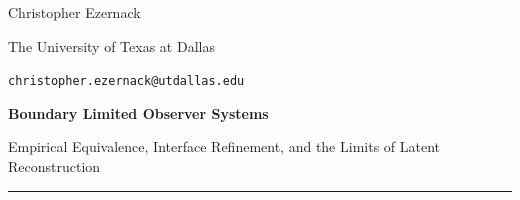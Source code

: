 \documentclass[12pt]{article}
\theoremstyle{definition}
\theoremstyle{plain}
\theoremstyle{remark}
\theoremstyle{definition}
\begin{document}
\begin{flushleft}
{\large Christopher Ezernack}\par
\small The University of Texas at Dallas\par
\small \texttt{christopher.ezernack@utdallas.edu}\par
\vspace{1.25em}
{\LARGE\bfseries Boundary Limited Observer Systems\par}
\vspace{0.3em}
{\large Empirical Equivalence, Interface Refinement, and the Limits of Latent Reconstruction\par}
\vspace{0.55em}
\end{flushleft}
\vspace{0.5em}
\hrule
\vspace{0.8em}





\clearpage
\appendix

















\FloatBarrier


\end{document}
